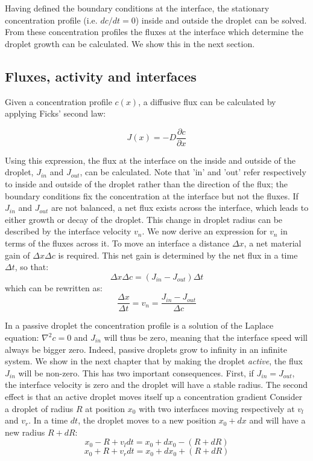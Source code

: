 \documentclass{Dissertate}
\begin{document}
Having defined the boundary conditions at the interface, the stationary concentration profile (i.e. $dc/dt=0$) inside and outside the droplet can be solved. From these concentration profiles the fluxes at the interface which determine the droplet growth can be calculated. We show this in the next section.


\hypertarget{fluxes-activity-and-interfaces}{%
\subsection{Fluxes, activity and
interfaces}\label{fluxes-activity-and-interfaces}}

Given a concentration profile \(c(x)\), a diffusive flux can be
calculated by applying Ficks' second law:

\[
J(x) = -D\frac{\partial c}{\partial x}
\]

Using this expression, the flux at the interface on the inside and
outside of the droplet, \(J_{in}\) and \(J_{out}\), can be calculated.
Note that 'in' and 'out' refer respectively to inside and outside of the
droplet rather than the direction of the flux; the boundary conditions
fix the concentration at the interface but not the fluxes. If $J_{in}$ and $J_{out}$ are not balanced, a net flux exists across
the interface, which leads to either growth or decay of the droplet. This change in droplet radius can be described by the interface velocity \(v_n\). We now
derive an expression for \(v_n\) in terms of the fluxes across it. To
move an interface a distance \(\Delta x\), a net material gain of
\(\Delta x \Delta c\) is required. This net gain is determined by the net flux
in a time \(\Delta t\), so that: \[
\Delta x \Delta c = (J_{in}-J_{out})\Delta t
\] which can be rewritten as: \begin{equation}
\frac{\Delta x}{\Delta t} = v_n = \frac{J_{in}-J_{out}}{\Delta c}
\label{eq:interfacespeed}\end{equation} 

In a passive droplet the concentration profile is a solution of the Laplace equation: $\nabla^2c=0$ and $J_{in}$ will thus be zero, meaning that the interface speed will always be bigger zero. Indeed, passive droplets grow to infinity in an infinite system. We show in the next chapter that by making the droplet \emph{active}, the flux $J_{in}$ will be non-zero. This has two important consequences. First, if $J_{in}=J_{out}$, the interface velocity is zero and the droplet will have a stable radius. The second effect is that an active droplet moves itself up a concentration gradient
Consider a droplet of radius \(R\) at position \(x_0\) with two interfaces moving respectively at \(v_l\) and \(v_r\). In a time \(dt\), the droplet moves to a new position \(x_0+dx\) and will have a new radius \(R+dR\): 
\[
x_0-R+v_ldt=x_0+dx_0-(R+dR)
\] \[
x_0+R+v_rdt=x_0+dx_0+(R+dR)
\]
\end{document}
